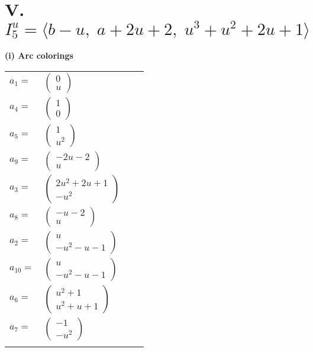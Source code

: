 \documentclass[1p]{elsarticle_modified}
\theoremstyle{definition}
\begin{document}
\centering \section*{V. $I^u_{5}= \langle b- u,\;a+2 u+2,\;u^3+u^2+2 u+1 \rangle$}
\flushleft \textbf{(i) Arc colorings}\\
\begin{tabular}{m{7pt} m{180pt} m{7pt} m{180pt} }
\flushright $a_{1}=$&$\begin{pmatrix}0\\u\end{pmatrix}$ \\
\flushright $a_{4}=$&$\begin{pmatrix}1\\0\end{pmatrix}$ \\
\flushright $a_{5}=$&$\begin{pmatrix}1\\u^2\end{pmatrix}$ \\
\flushright $a_{9}=$&$\begin{pmatrix}-2 u-2\\u\end{pmatrix}$ \\
\flushright $a_{3}=$&$\begin{pmatrix}2 u^2+2 u+1\\- u^2\end{pmatrix}$ \\
\flushright $a_{8}=$&$\begin{pmatrix}- u-2\\u\end{pmatrix}$ \\
\flushright $a_{2}=$&$\begin{pmatrix}u\\- u^2- u-1\end{pmatrix}$ \\
\flushright $a_{10}=$&$\begin{pmatrix}u\\- u^2- u-1\end{pmatrix}$ \\
\flushright $a_{6}=$&$\begin{pmatrix}u^2+1\\u^2+u+1\end{pmatrix}$ \\
\flushright $a_{7}=$&$\begin{pmatrix}-1\\- u^2\end{pmatrix}$\\&\end{tabular}
\end{document}
